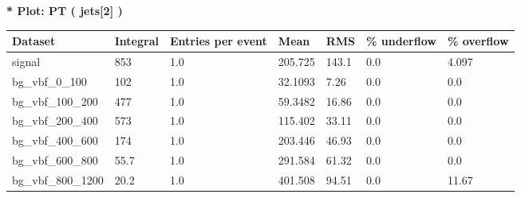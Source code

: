 \documentclass[a4paper, 10pt]{article}
\begin{document}
\textbf{* Plot: PT ( jets[2] ) }\\
   \begin{table}[H]
  \begin{center}
    \begin{tabular}{|m{23.0mm}|m{23.0mm}|m{18.0mm}|m{19.0mm}|m{19.0mm}|m{19.0mm}|m{19.0mm}|}
      \hline
      {\cellcolor{yellow}         Dataset}& {\cellcolor{yellow}         Integral}& {\cellcolor{yellow}         Entries per event}& {\cellcolor{yellow}         Mean}& {\cellcolor{yellow}         RMS}& {\cellcolor{yellow}         \% underflow}& {\cellcolor{yellow}         \% overflow}\\
      \hline
      {\cellcolor{white}         signal}& {\cellcolor{white}         853}& {\cellcolor{white}         1.0}& {\cellcolor{white}         205.725}& {\cellcolor{white}         143.1}& {\cellcolor{green}         0.0}& {\cellcolor{green}         4.097}\\
      \hline
      {\cellcolor{white}         bg\_vbf\_0\_100}& {\cellcolor{white}         102}& {\cellcolor{white}         1.0}& {\cellcolor{white}         32.1093}& {\cellcolor{white}         7.26}& {\cellcolor{green}         0.0}& {\cellcolor{green}         0.0}\\
      \hline
      {\cellcolor{white}         bg\_vbf\_100\_200}& {\cellcolor{white}         477}& {\cellcolor{white}         1.0}& {\cellcolor{white}         59.3482}& {\cellcolor{white}         16.86}& {\cellcolor{green}         0.0}& {\cellcolor{green}         0.0}\\
      \hline
      {\cellcolor{white}         bg\_vbf\_200\_400}& {\cellcolor{white}         573}& {\cellcolor{white}         1.0}& {\cellcolor{white}         115.402}& {\cellcolor{white}         33.11}& {\cellcolor{green}         0.0}& {\cellcolor{green}         0.0}\\
      \hline
      {\cellcolor{white}         bg\_vbf\_400\_600}& {\cellcolor{white}         174}& {\cellcolor{white}         1.0}& {\cellcolor{white}         203.446}& {\cellcolor{white}         46.93}& {\cellcolor{green}         0.0}& {\cellcolor{green}         0.0}\\
      \hline
      {\cellcolor{white}         bg\_vbf\_600\_800}& {\cellcolor{white}         55.7}& {\cellcolor{white}         1.0}& {\cellcolor{white}         291.584}& {\cellcolor{white}         61.32}& {\cellcolor{green}         0.0}& {\cellcolor{green}         0.0}\\
      \hline
      {\cellcolor{white}         bg\_vbf\_800\_1200}& {\cellcolor{white}         20.2}& {\cellcolor{white}         1.0}& {\cellcolor{white}         401.508}& {\cellcolor{white}         94.51}& {\cellcolor{orange}         0.0}& {\cellcolor{orange}         11.67}\\

\end{tabular}
\end{center}
\end{table}
\end{document}
